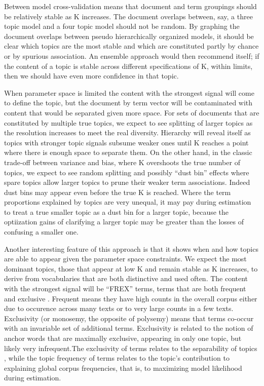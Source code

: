 \documentclass[]{book}
\theoremstyle{definition}
\theoremstyle{definition}
\theoremstyle{definition}
\theoremstyle{remark}
\begin{document}
Between model cross-validation means that document and term groupings
should be relatively stable as K increases. The document overlaps
between, say, a three topic model and a four topic model should not be
random. By graphing the document overlaps between pseudo hierarchically
organized models, it should be clear which topics are the most stable
and which are constituted partly by chance or by spurious association.
An ensemble approach would then recommend itself; if the content of a
topic is stable across different specifications of K, within limits,
then we should have even more confidence in that topic.

When parameter space is limited the content with the strongest signal
will come to define the topic, but the document by term vector will be
contaminated with content that would be separated given more space. For
sets of documents that are constituted by multiple true topics, we
expect to see splitting of larger topics as the resolution increases to
meet the real diversity. Hierarchy will reveal itself as topics with
stronger topic signals subsume weaker ones until K reaches a point where
there is enough space to separate them. On the other hand, in the
classic trade-off between variance and bias, where K overshoots the true
number of topics, we expect to see random splitting and possibly ``dust
bin'' effects where spare topics allow larger topics to prune their
weaker term associations. Indeed dust bins may appear even before the
true K is reached. Where the term proportions explained by topics are
very unequal, it may pay during estimation to treat a true smaller topic
as a dust bin for a larger topic, because the optiization gains of
clarifying a larger topic may be greater than the losses of confusing a
smaller one.

Another interesting feature of this approach is that it shows when and
how topics are able to appear given the parameter space constraints. We
expect the most dominant topics, those that appear at low K and remain
stable as K increases, to derive from vocabularies that are both
distinctive and used often. The content with the strongest signal will
be ``FREX'' terms, terms that are both frequent and exclusive
\citep{Bischof2012Summarizing}. Frequent means they have high counts in
the overall corpus either due to occurence across many texts or to very
large counts in a few texts. Exclusivity (or monosemy, the opposite of
polysemy) means that terms co-occur with an invariable set of additional
terms. Exclusivity is related to the notion of anchor words that are
maximally exclusive, appearing in only one topic, but likely very
infrequent.The exclusivity of terms relates to the separability of
topics \citep{Arora2018Learning}, while the topic frequency of terms
relates to the topic's contribution to explaining global corpus
frequencies, that is, to maximizing model likelihood during estimation.
\end{document}
